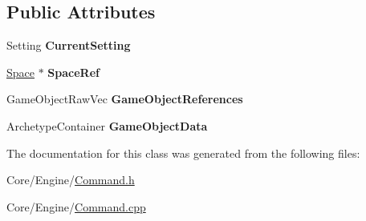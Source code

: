 \subsection*{Public Attributes}
\begin{DoxyCompactItemize}
\item 
\hypertarget{classDCEngine_1_1CommandObjectCreation_a89067b099fcda02f3c2e6363df151f4e}{Setting {\bfseries Current\-Setting}}\label{classDCEngine_1_1CommandObjectCreation_a89067b099fcda02f3c2e6363df151f4e}

\item 
\hypertarget{classDCEngine_1_1CommandObjectCreation_a50e2a97172026832eed0c7ff22595e00}{\hyperlink{classDCEngine_1_1Space}{Space} $\ast$ {\bfseries Space\-Ref}}\label{classDCEngine_1_1CommandObjectCreation_a50e2a97172026832eed0c7ff22595e00}

\item 
\hypertarget{classDCEngine_1_1CommandObjectCreation_aa05e09aa8d81824ba2e00c1ad370043c}{Game\-Object\-Raw\-Vec {\bfseries Game\-Object\-References}}\label{classDCEngine_1_1CommandObjectCreation_aa05e09aa8d81824ba2e00c1ad370043c}

\item 
\hypertarget{classDCEngine_1_1CommandObjectCreation_a42c5414e7e6f75a54d9c2a800f4a7e9b}{Archetype\-Container {\bfseries Game\-Object\-Data}}\label{classDCEngine_1_1CommandObjectCreation_a42c5414e7e6f75a54d9c2a800f4a7e9b}

\end{DoxyCompactItemize}


The documentation for this class was generated from the following files\-:\begin{DoxyCompactItemize}
\item 
Core/\-Engine/\hyperlink{Command_8h}{Command.\-h}\item 
Core/\-Engine/\hyperlink{Command_8cpp}{Command.\-cpp}\end{DoxyCompactItemize}
